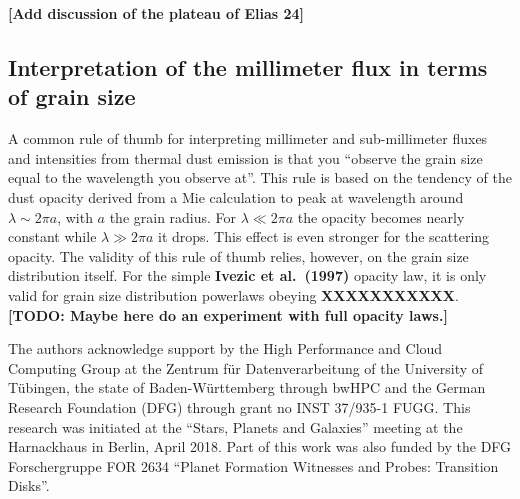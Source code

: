 \documentclass{aa}
\begin{document}
{\bf [Add discussion of the plateau of Elias 24]}

\subsection{Interpretation of the millimeter flux in terms of grain size}
A common rule of thumb for interpreting millimeter and sub-millimeter
fluxes and intensities from thermal dust emission is that you ``observe
the grain size equal to the wavelength you observe at''. This rule is
based on the tendency of the dust opacity derived from a Mie calculation
to peak at wavelength around $\lambda\sim 2\pi a$, with $a$ the grain
radius. For $\lambda \ll 2\pi a$ the opacity becomes nearly constant
while $\lambda \gg 2\pi a$ it drops. This effect is even stronger for
the scattering opacity. The validity of this rule of thumb relies,
however, on the grain size distribution itself. For the simple
{\bf Ivezic et al.~(1997)} opacity law, it is only valid for
grain size distribution powerlaws obeying {\bf XXXXXXXXXXX}.
{\bf [TODO: Maybe here do an experiment with full opacity laws.]}




\begin{acknowledgements}
  The authors acknowledge support
  by the High Performance and Cloud Computing Group at the Zentrum f\"ur
  Datenverarbeitung of the University of T\"ubingen, the state of
  Baden-W\"urttemberg through bwHPC and the German Research Foundation (DFG)
  through grant no INST 37/935-1 FUGG. This research was initiated at the
  ``Stars, Planets and Galaxies'' meeting at the Harnackhaus in Berlin,
  April 2018. Part of this work was also funded by the DFG Forschergruppe
  FOR 2634 ``Planet Formation Witnesses and Probes: Transition Disks''.
\end{acknowledgements}


\begingroup


\endgroup

\appendix
\end{document}
